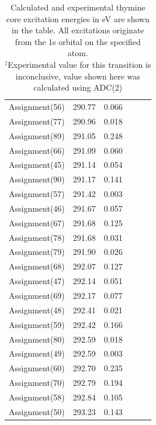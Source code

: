 \documentclass[12pt]{article}
\begin{document}
\begin{table}
\begin{tabular}{c@{\hskip 0.22in}c@{\hskip 0.22in}c@{\hskip 0.52in}c@{\hskip 0.22in}c@{\hskip 0.22in}c}
 Assignment(56) & 290.77 & 0.066 \\
 Assignment(77) & 290.96 & 0.018 \\
 Assignment(89) & 291.05 & 0.248 \\
 Assignment(66) & 291.09 & 0.060 \\
 Assignment(45) & 291.14 & 0.054 \\
 Assignment(90) & 291.17 & 0.141 \\
 Assignment(57) & 291.42 & 0.003 \\
 Assignment(46) & 291.67 & 0.057 \\
 Assignment(67) & 291.68 & 0.125 \\
 Assignment(78) & 291.68 & 0.031 \\
 Assignment(79) & 291.90 & 0.026 \\
 Assignment(68) & 292.07 & 0.127 \\
 Assignment(47) & 292.14 & 0.051 \\
 Assignment(69) & 292.17 & 0.077 \\
 Assignment(48) & 292.41 & 0.021 \\
 Assignment(59) & 292.42 & 0.166 \\
 Assignment(80) & 292.59 & 0.018 \\
 Assignment(49) & 292.59 & 0.003 \\
 Assignment(60) & 292.70 & 0.235 \\
 Assignment(70) & 292.79 & 0.194 \\
 Assignment(58) & 292.84 & 0.105 \\
 Assignment(50) & 293.23 & 0.143 \\
     \end{tabular}
      \caption{Calculated and experimental thymine core excitation energies in eV are shown in the table. All excitations originate from the 1s orbital on the specified atom. \\
  $^{\ddagger}$Experimental value for this transition is inconclusive, value shown here was calculated using ADC(2)}
  \label{figure:MOs}
  \end{table}
\end{document}
